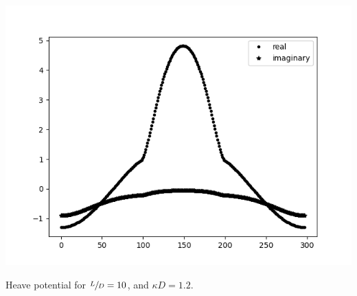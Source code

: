 \begin{Figure}
    \centering
    \captionsetup{type = figure}
    \includegraphics[width = \textwidth]{heave_L10_D1_kD1p2.png}
    \caption{Heave potential for $\sfrac{L}{D} = 10$, and $\kappa D = 1.2$.}
\end{Figure}